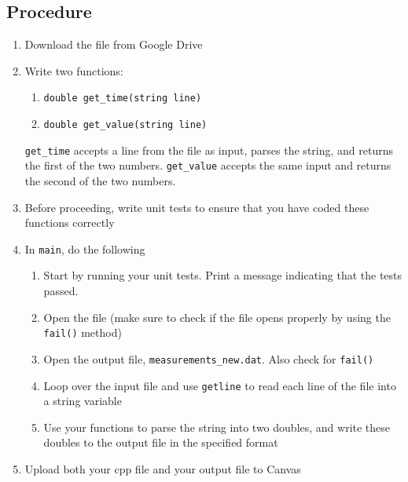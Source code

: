 \documentclass{article}
\begin{document}
\subsection*{Procedure}
\begin{enumerate}
	\item Download the file \href{https://drive.google.com/file/d/1R6SKvNjw3gBTm9NVox_0aP4c2HqBlKcj/view?usp=sharing}{\filename} from Google Drive
	\item Write two functions:
	\begin{enumerate}
		\item \texttt{double get\_time(string line)}
		\item \texttt{double get\_value(string line)}
	\end{enumerate}
	\texttt{get\_time} accepts a line from the file as input, parses the string, and returns the first of the two numbers. \texttt{get\_value} accepts the same input and returns the second of the two numbers.
	\item Before proceeding, write unit tests to ensure that you have coded these functions correctly
	\item In \texttt{main}, do the following
	\begin{enumerate}
		\item Start by running your unit tests. Print a message indicating that the tests passed.
		\item Open the file \filename{} (make sure to check if the file opens properly by using the \texttt{fail()} method)
		\item Open the output file, \texttt{measurements\_new.dat}. Also check for \texttt{fail()}
		\item Loop over the input file and use \texttt{getline} to read each line of the file into a string variable
		\item Use your functions to parse the string into two doubles, and write these doubles to the output file in the specified format
	\end{enumerate}
	\item Upload both your cpp file and your output file to Canvas
\end{enumerate}
\end{document}
